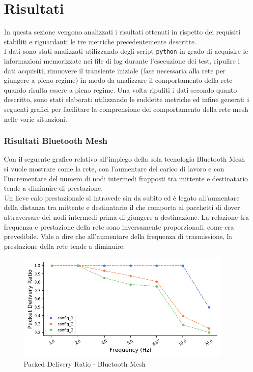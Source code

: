 \section{Risultati}
In questa sezione vengono analizzati i risultati ottenuti in rispetto dei requisiti stabiliti e riguardanti le tre metriche precedentemente descritte.\\
I dati sono stati analizzati utilizzando degli script \texttt{python} in grado di acquisire le informazioni memorizzate nei file di log durante l'esecuzione dei test, ripulire i dati acquisiti, rimuovere il transiente iniziale (fase necessaria alla rete per giungere a pieno regime) in modo da analizzare il comportamento della rete quando risulta essere a pieno regime. Una volta ripuliti i dati secondo quanto descritto, sono stati elaborati utilizzando le suddette metriche ed infine generati i seguenti grafici per facilitare la comprensione del comportamento della rete mesh nelle varie situazioni.

\subsubsection{Risultati Bluetooth Mesh}
\noindent Con il seguente grafico relativo all'impiego della sola tecnologia Bluetooth Mesh si vuole mostrare come la rete, con l'aumentare del carico di lavoro e con l'incrementare del numero di nodi intermedi frapposti tra mittente e destinatario tende a diminuire di prestazione.\\

\noindent Un lieve calo prestazionale si intravede sin da subito ed è legato all'aumentare della distanza tra mittente e destinatario il che comporta ai pacchetti di dover attraversare dei nodi intermedi prima di giungere a destinazione. La relazione tra frequenza e prestazione della rete sono inversamente proporzionali, come era prevedibile. Vale a dire che all'aumentare della frequenza di trasmissione, la prestazione della rete tende a diminuire.

\begin{figure}[hbt!]
    \centering
    \includegraphics[width = 0.95\textwidth]{images/graphs/ble_pdr.png}
    \caption{Packed Delivery Ratio - Bluetooth Mesh}
    \label{graph:ble_pdr}
\end{figure}

